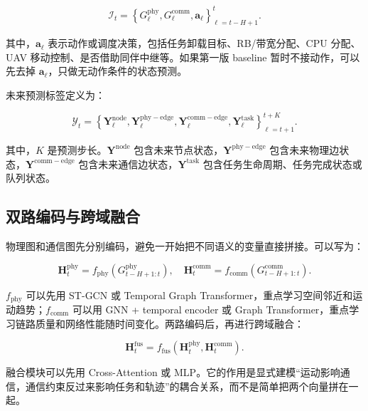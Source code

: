 ﻿\documentclass[UTF8,a4paper,11pt]{ctexart}
\begin{document}
\begin{equation}
\mathcal{I}_t
=
\left\{
G_{\ell}^{\mathrm{phy}},
G_{\ell}^{\mathrm{comm}},
\mathbf{a}_{\ell}
\right\}_{\ell=t-H+1}^{t}.
\end{equation}

其中，$\mathbf{a}_{\ell}$ 表示动作或调度决策，包括任务卸载目标、RB/带宽分配、CPU 分配、UAV 移动控制、是否借助同伴中继等。如果第一版 baseline 暂时不接动作，可以先去掉 $\mathbf{a}_{\ell}$，只做无动作条件的状态预测。

未来预测标签定义为：

\begin{equation}
\mathcal{Y}_t
=
\left\{
\mathbf{Y}_{\ell}^{\mathrm{node}},
\mathbf{Y}_{\ell}^{\mathrm{phy-edge}},
\mathbf{Y}_{\ell}^{\mathrm{comm-edge}},
\mathbf{Y}_{\ell}^{\mathrm{task}}
\right\}_{\ell=t+1}^{t+K}.
\end{equation}

其中，$K$ 是预测步长。$\mathbf{Y}^{\mathrm{node}}$ 包含未来节点状态，$\mathbf{Y}^{\mathrm{phy-edge}}$ 包含未来物理边状态，$\mathbf{Y}^{\mathrm{comm-edge}}$ 包含未来通信边状态，$\mathbf{Y}^{\mathrm{task}}$ 包含任务生命周期、任务完成状态或队列状态。

\subsection{双路编码与跨域融合}

物理图和通信图先分别编码，避免一开始把不同语义的变量直接拼接。可以写为：

\begin{equation}
\mathbf{H}_t^{\mathrm{phy}}
=
f_{\mathrm{phy}}
\left(
G_{t-H+1:t}^{\mathrm{phy}}
\right),
\quad
\mathbf{H}_t^{\mathrm{comm}}
=
f_{\mathrm{comm}}
\left(
G_{t-H+1:t}^{\mathrm{comm}}
\right).
\end{equation}

$f_{\mathrm{phy}}$ 可以先用 ST-GCN 或 Temporal Graph Transformer，重点学习空间邻近和运动趋势；$f_{\mathrm{comm}}$ 可以用 GNN + temporal encoder 或 Graph Transformer，重点学习链路质量和网络性能随时间变化。两路编码后，再进行跨域融合：

\begin{equation}
\mathbf{H}_t^{\mathrm{fus}}
=
f_{\mathrm{fus}}
\left(
\mathbf{H}_t^{\mathrm{phy}},
\mathbf{H}_t^{\mathrm{comm}}
\right).
\end{equation}

融合模块可以先用 Cross-Attention 或 MLP。它的作用是显式建模“运动影响通信，通信约束反过来影响任务和轨迹”的耦合关系，而不是简单把两个向量拼在一起。
\end{document}
